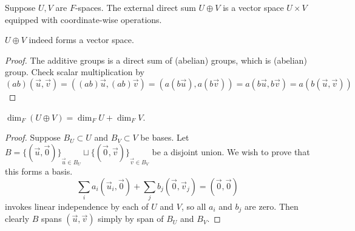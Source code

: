 \begin{definition}
    Suppose \(U,V\) are \(F\)-spaces.
    The external direct sum \(U \oplus V\)
    is a vector space \(U \times V\)
    equipped with coordinate-wise operations.
\end{definition}
\begin{lemma}
    \(U \oplus V\) indeed forms a vector space.
\end{lemma}
\begin{proof}
    The additive groups is a direct sum of (abelian) groups,
    which is (abelian) group.
    Check scalar multiplication by
    \begin{equation*}
        (ab)(\vec{u},\vec{v}) = ((ab)\vec{u},(ab)\vec{v})
        = (a(b\vec{u}),a(b\vec{v})) = a(b\vec{u},b\vec{v})
        = a(b(\vec{u},\vec{v}))
    \end{equation*}
\end{proof}
\begin{lemma}\label{lem:dim-direct-sum}
    \(\dim_F(U \oplus V) = \dim_F U + \dim_F V\).
\end{lemma}
\begin{proof}
    Suppose \(B_U \subset U\) and \(B_V \subset V\) be bases.
    Let \(B = {\{(\vec{u},\vec{0})\}}_{\vec{u} \in B_U} \sqcup
    {\{(\vec{0},\vec{v})\}}_{\vec{v} \in B_V}\) be a disjoint union.
    We wish to prove that this forms a basis.
    \begin{equation*}
        \sum_i a_i(\vec{u}_i,\vec{0}) + \sum_j b_j(\vec{0},\vec{v}_j)
        = (\vec{0},\vec{0})
    \end{equation*}
    invokes linear independence by each of \(U\) and \(V\),
    so all \(a_i\) and \(b_j\) are zero.
    Then clearly \(B\) spans \((\vec{u},\vec{v})\)
    simply by span of \(B_U\) and \(B_V\).
\end{proof}

